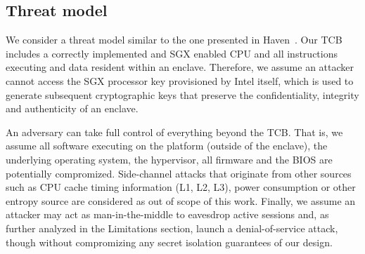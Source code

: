 \documentclass[../main.tex]{subfiles}
\begin{document}
\subsection{Threat model} 
We consider a threat model similar to the one presented in Haven~\cite{Baumann14}. Our TCB
includes a correctly implemented and SGX enabled CPU and all instructions
executing and data resident within an enclave. Therefore, we assume an attacker
cannot access the SGX processor key provisioned by Intel itself, which is used
to generate subsequent cryptographic keys that preserve the confidentiality,
integrity and authenticity of an enclave.

An adversary can take full control of everything beyond the TCB. That is, we
assume all software executing on the platform (outside of the enclave), the
underlying operating system, the hypervisor, all firmware and the BIOS are
potentially compromized. Side-channel attacks that originate from other sources
such as CPU cache timing information (L1, L2, L3), power consumption or other
entropy source are considered as out of scope of this work. Finally, we assume
an attacker may act as man-in-the-middle to eavesdrop active sessions and,
as further analyzed in the Limitations section, launch a denial-of-service
attack, though without compromizing any secret isolation guarantees of our
design.
\end{document}

